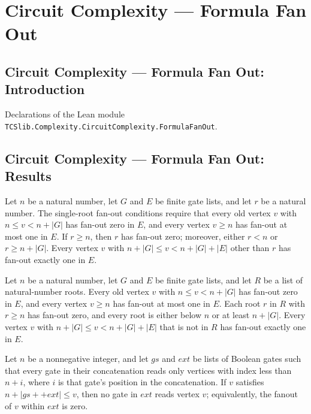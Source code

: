 \section{Circuit Complexity --- Formula Fan Out}
\subsection*{Circuit Complexity --- Formula Fan Out: Introduction}

Declarations of the Lean module \texttt{TCSlib.Complexity.CircuitComplexity.FormulaFanOut}.

\subsection*{Circuit Complexity --- Formula Fan Out: Results}

\begin{definition}
\label{BoolCircuit.CompileFanout}
\leanok
{}
Let $n$ be a natural number, let $G$ and $E$ be finite gate lists, and let $r$ be a
natural number. The single-root fan-out conditions require that every old vertex $v$
with $n\le v<n+|G|$ has fan-out zero in $E$, and every vertex $v\ge n$ has fan-out at
most one in $E$. If $r\ge n$, then $r$ has fan-out zero; moreover, either $r<n$ or $r\ge
n+|G|$. Every vertex $v$ with $n+|G|\le v<n+|G|+|E|$ other than $r$ has fan-out exactly
one in $E$.
\end{definition}

\begin{definition}
\label{BoolCircuit.CompileListFanout}
\leanok
{}
Let $n$ be a natural number, let $G$ and $E$ be finite gate lists, and let $R$ be a list
of natural-number roots. Every old vertex $v$ with $n\le v<n+|G|$ has fan-out zero in
$E$, and every vertex $v\ge n$ has fan-out at most one in $E$. Each root $r$ in $R$ with
$r\ge n$ has fan-out zero, and every root is either below $n$ or at least $n+|G|$. Every
vertex $v$ with $n+|G|\le v<n+|G|+|E|$ that is not in $R$ has fan-out exactly one in
$E$.
\end{definition}

\begin{theorem}
\label{BoolCircuit.fanoutIn_ext_eq_zero}
\leanok
{}
Let $n$ be a nonnegative integer, and let $gs$ and $ext$ be lists of Boolean gates such
that every gate in their concatenation reads only vertices with index less than $n+i$,
where $i$ is that gate’s position in the concatenation. If $v$ satisfies $n+|gs++ext|\le
v$, then no gate in $ext$ reads vertex $v$; equivalently, the fanout of $v$ within $ext$
is zero.
\end{theorem}

